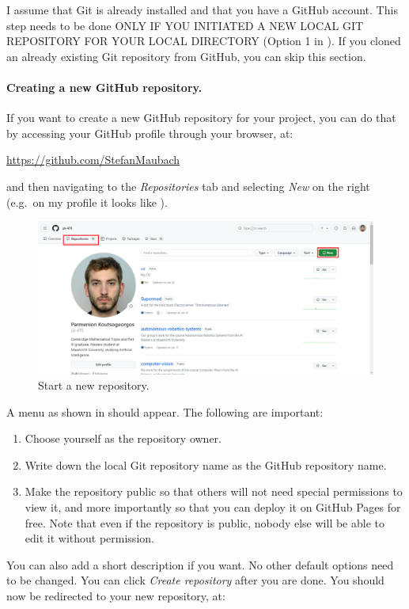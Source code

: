 \documentclass[a4paper,10pt]{article}
\begin{document}
I assume that Git is already installed and that you have a GitHub account. This step needs to be done ONLY IF YOU INITIATED A NEW LOCAL GIT REPOSITORY FOR YOUR LOCAL DIRECTORY (Option 1 in ). If you cloned an already existing Git repository from GitHub, you can skip this section.

\paragraph{Creating a new GitHub repository.} If you want to create a new GitHub repository for your project, you can do that by accessing your GitHub profile through your browser, at:

\url{https://github.com/StefanMaubach}

and then navigating to the \emph{Repositories} tab and selecting \emph{New} on the right (e.g.\ on my profile it looks like ).

\begin{figure}[htbp]
    \centering
    \includegraphics[width=\textwidth]{new_repository.png}
    \caption{Start a new repository.}
    \label{fig:new_repository}   
\end{figure}

A menu as shown in  should appear. The following are important:
\begin{enumerate}
    \item Choose yourself as the repository owner.
    \item Write down the local Git repository name as the GitHub repository name.
    \item Make the repository public so that others will not need special permissions to view it, and more importantly so that you can deploy it on GitHub Pages for free. Note that even if the repository is public, nobody else will be able to edit it without permission.
\end{enumerate}
You can also add a short description if you want. No other default options need to be changed. You can click \emph{Create repository} after you are done. You should now be redirected to your new repository, at:
\end{document}
